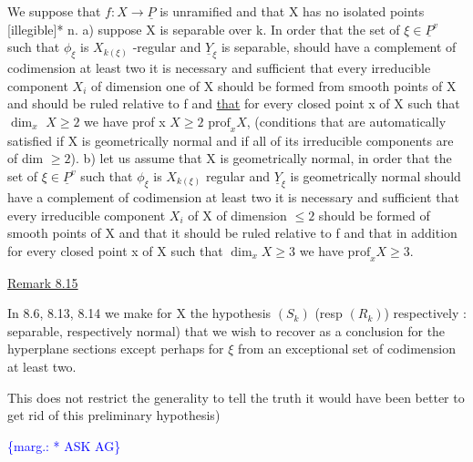 \documentclass[11pt]{article}
\newcommand{\scanpage}[1]{\par\bigskip\noindent{\small\sffamily[scan #1]}\par}
\newcommand{\mspage}[1]{{\small\sffamily[p.\,#1]}}
\newcommand{\margin}[1]{\textcolor{blue}{\{\textsf{marg.:} #1\}}}
\newcommand{\uline}[1]{\underline{#1}}
\begin{document}
We suppose that $f\colon X \to \underline{P}$ is unramified and that X has no
isolated points [illegible]* n.
a) suppose X is separable over k.  In order that the set of $\xi \in \underline{P}^{v}$
such that $\phi_{\xi}$ is $X_{k(\xi)}$ -regular and $\underline{Y}_{\xi}$ is separable, should have a
complement of codimension at least two it is necessary and
sufficient that every irreducible component $X_{i}$ of dimension one of
X should be formed from smooth points of X and should be ruled
relative to f and \uline{that} for every closed point x of X such that $\dim_{x}$
$X \geq 2$ we have prof x $X \geq 2$ $\mathrm{prof}_{x}X$, (conditions that are
automatically satisfied if X is geometrically normal and if all of
its irreducible components are of dim $\geq 2$).
b) let us assume that X is geometrically normal, in order that the
set of $\xi \in \underline{P}^{v}$ such that $\phi_{\xi}$ is $X_{k(\xi)}$ regular and $\underline{Y}_{\xi}$ is geometrically
normal should have a complement of codimension at least two it is
necessary and sufficient that every irreducible component $X_{i}$ of X
of dimension $\leq 2$ should be formed of smooth points of X and that
it should be ruled relative to f and that in addition for every
closed point x of X such that $\dim_{x} X \geq 3$ we have $\mathrm{prof}_{x} X \geq 3$.

\uline{Remark 8.15}

In 8.6, 8.13, 8.14 we make for X the hypothesis $(S_{k})$ (resp
$(R_{k})$) respectively : separable, respectively normal) that we wish
to recover as a conclusion for the hyperplane sections except
perhaps for $\xi$ from an exceptional set of codimension at least two.

This does not restrict the generality to tell the truth it
would have been better to get rid of this preliminary hypothesis)

\margin{* ASK AG}

\clearpage
\scanpage{24/56}
\mspage{56}
\end{document}
